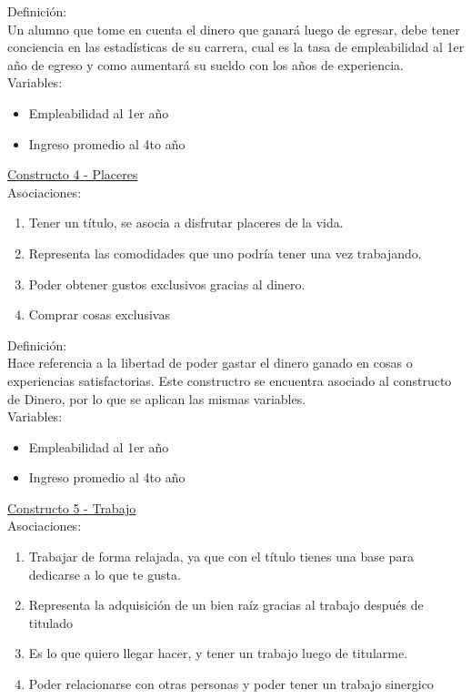 Definición:\\
Un alumno que tome en cuenta el dinero que ganará luego de egresar, debe tener conciencia en las estadísticas de su carrera, cual es la tasa de empleabilidad al 1er año de egreso y como aumentará su sueldo con los años de experiencia.\\

Variables:
\begin{itemize}
	\item Empleabilidad al 1er año
	\item Ingreso promedio al 4to año	
\end{itemize} 

\underline {Constructo 4 - Placeres}\\ 
Asociaciones:
\begin{enumerate}
	\item Tener un título, se asocia a disfrutar placeres de la vida.
	\item Representa las comodidades que uno podría tener una vez trabajando.	
	\item Poder obtener gustos exclusivos gracias al dinero.
	\item Comprar cosas exclusivas
\end{enumerate}

Definición:\\
Hace referencia a la libertad de poder gastar el dinero ganado en cosas o experiencias satisfactorias. Este constructro se encuentra asociado al constructo de Dinero, por lo que se aplican las mismas variables.\\

Variables:
\begin{itemize}
	\item Empleabilidad al 1er año
	\item Ingreso promedio al 4to año	
\end{itemize} 

\underline {Constructo 5 - Trabajo} \\
Asociaciones:
\begin{enumerate}
	\item Trabajar de forma relajada, ya que con el título tienes una base para dedicarse a lo que te gusta.
	\item Representa la adquisición de un bien raíz gracias al trabajo después de titulado
	\item Es lo que quiero llegar hacer, y tener un trabajo luego de titularme.	
	\item Poder relacionarse con otras personas y poder tener un trabajo sinergico
\end{enumerate}

